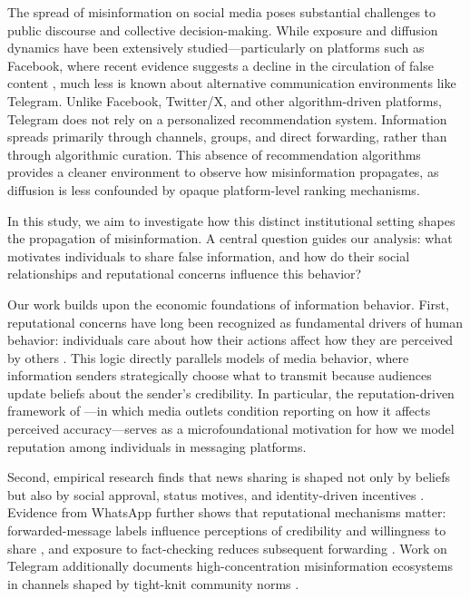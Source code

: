 
The spread of misinformation on social media poses substantial challenges to public discourse and collective decision-making. While exposure and diffusion dynamics have been extensively studied—particularly on platforms such as Facebook, where recent evidence suggests a decline in the circulation of false content \citep{allcott2019trends}, much less is known about alternative communication environments like Telegram. Unlike Facebook, Twitter/X, and other algorithm-driven platforms, Telegram does not rely on a personalized recommendation system. Information spreads primarily through channels, groups, and direct forwarding, rather than through algorithmic curation. This absence of recommendation algorithms provides a cleaner environment to observe how misinformation propagates, as diffusion is less confounded by opaque platform-level ranking mechanisms.

In this study, we aim to investigate how this distinct institutional setting shapes the propagation of misinformation. A central question guides our analysis: what motivates individuals to share false information, and how do their social relationships and reputational concerns influence this behavior?

Our work builds upon the economic foundations of information behavior. First, reputational concerns have long been recognized as fundamental drivers of human behavior: individuals care about how their actions affect how they are perceived by others \citep{benabou2006incentives, benabou2011identity}. This logic directly parallels models of media behavior, where information senders strategically choose what to transmit because audiences update beliefs about the sender's credibility. In particular, the reputation-driven framework of \citet{acemoglu2024misinformation}—in which media outlets condition reporting on how it affects perceived accuracy—serves as a microfoundational motivation for how we model reputation among individuals in messaging platforms.

Second, empirical research finds that news sharing is shaped not only by beliefs but also by social approval, status motives, and identity-driven incentives \citep{talwar2020fake, wu2025motivations, vellani2024motives}. Evidence from WhatsApp further shows that reputational mechanisms matter: forwarded-message labels influence perceptions of credibility and willingness to share \citep{tandoc2022forwarded}, and exposure to fact-checking reduces subsequent forwarding \citep{reis2020whatsapp}. Work on Telegram additionally documents high-concentration misinformation ecosystems in channels shaped by tight-knit community norms \citep{herasimenka2022telegram}.

